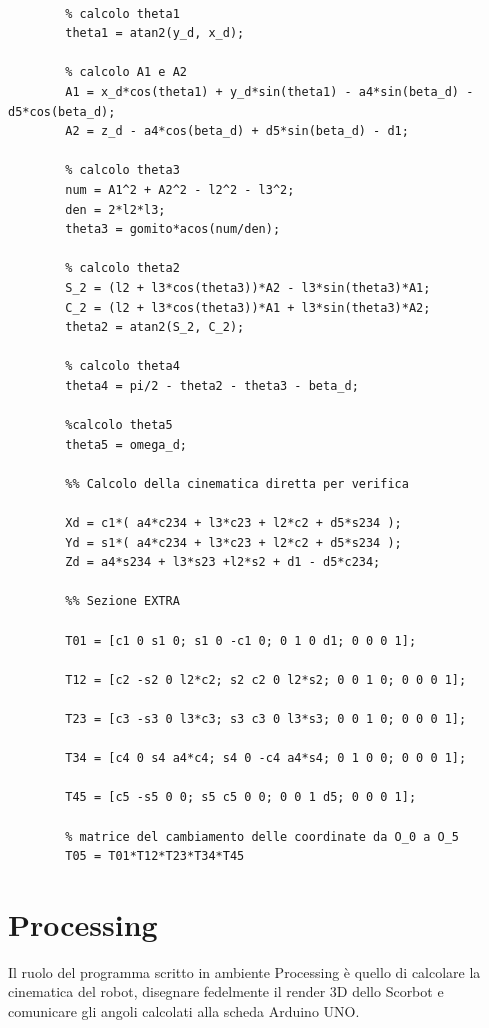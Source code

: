 \documentclass[a4paper]{article}
\begin{document}
    \begin{lstlisting}[style=mymatlabstyle, caption=Alcune sezioni riassuntive del codice MATLAB]
        %% Calcolo cinematica inversa
        
        % calcolo theta1
        theta1 = atan2(y_d, x_d);
        
        % calcolo A1 e A2
        A1 = x_d*cos(theta1) + y_d*sin(theta1) - a4*sin(beta_d) - d5*cos(beta_d);
        A2 = z_d - a4*cos(beta_d) + d5*sin(beta_d) - d1;
        
        % calcolo theta3
        num = A1^2 + A2^2 - l2^2 - l3^2;
        den = 2*l2*l3;
        theta3 = gomito*acos(num/den);
        
        % calcolo theta2
        S_2 = (l2 + l3*cos(theta3))*A2 - l3*sin(theta3)*A1;
        C_2 = (l2 + l3*cos(theta3))*A1 + l3*sin(theta3)*A2;
        theta2 = atan2(S_2, C_2);
        
        % calcolo theta4
        theta4 = pi/2 - theta2 - theta3 - beta_d;
        
        %calcolo theta5
        theta5 = omega_d;
      
        %% Calcolo della cinematica diretta per verifica
    
        Xd = c1*( a4*c234 + l3*c23 + l2*c2 + d5*s234 );
        Yd = s1*( a4*c234 + l3*c23 + l2*c2 + d5*s234 );
        Zd = a4*s234 + l3*s23 +l2*s2 + d1 - d5*c234;
        
        %% Sezione EXTRA
      
        T01 = [c1 0 s1 0; s1 0 -c1 0; 0 1 0 d1; 0 0 0 1];
        
        T12 = [c2 -s2 0 l2*c2; s2 c2 0 l2*s2; 0 0 1 0; 0 0 0 1];
        
        T23 = [c3 -s3 0 l3*c3; s3 c3 0 l3*s3; 0 0 1 0; 0 0 0 1];
        
        T34 = [c4 0 s4 a4*c4; s4 0 -c4 a4*s4; 0 1 0 0; 0 0 0 1];
        
        T45 = [c5 -s5 0 0; s5 c5 0 0; 0 0 1 d5; 0 0 0 1];
        
        % matrice del cambiamento delle coordinate da O_0 a O_5
        T05 = T01*T12*T23*T34*T45
    \end{lstlisting}
    
    \newpage
    \section{Processing}
    
    \begin{text}
        Il ruolo del programma scritto in ambiente Processing è quello di calcolare la cinematica del robot, disegnare fedelmente il render 3D dello Scorbot e comunicare gli angoli calcolati alla scheda Arduino UNO.
    \end{text}
    
\end{document}
